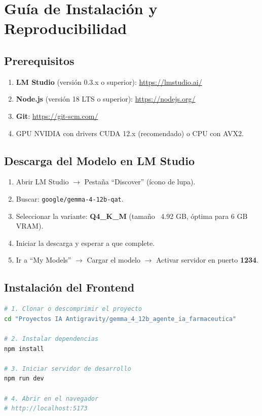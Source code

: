\documentclass[12pt,a4paper]{article}
\begin{document}
\newpage

\section{Guía de Instalación y Reproducibilidad}

\subsection{Prerequisitos}

\begin{enumerate}
  \item \textbf{LM Studio} (versión 0.3.x o superior): \url{https://lmstudio.ai/}
  \item \textbf{Node.js} (versión 18 LTS o superior): \url{https://nodejs.org/}
  \item \textbf{Git}: \url{https://git-scm.com/}
  \item GPU NVIDIA con drivers CUDA 12.x (recomendado) o CPU con AVX2.
\end{enumerate}

\subsection{Descarga del Modelo en LM Studio}

\begin{enumerate}
  \item Abrir LM Studio $\rightarrow$ Pestaña ``Discover'' (ícono de lupa).
  \item Buscar: \texttt{google/gemma-4-12b-qat}.
  \item Seleccionar la variante: \textbf{Q4\_K\_M} (tamaño ~4.92 GB, óptima para 6 GB VRAM).
  \item Iniciar la descarga y esperar a que complete.
  \item Ir a ``My Models'' $\rightarrow$ Cargar el modelo $\rightarrow$ Activar servidor en
    puerto \textbf{1234}.
\end{enumerate}

\subsection{Instalación del Frontend}

\begin{lstlisting}[language=bash, backgroundcolor=\color{codeblue}, basicstyle=\ttfamily\small\color{codefg}, numbers=none, frame=single]
# 1. Clonar o descomprimir el proyecto
cd "Proyectos IA Antigravity/gemma_4_12b_agente_ia_farmaceutica"

# 2. Instalar dependencias
npm install

# 3. Iniciar servidor de desarrollo
npm run dev

# 4. Abrir en el navegador
# http://localhost:5173
\end{lstlisting}
\end{document}
